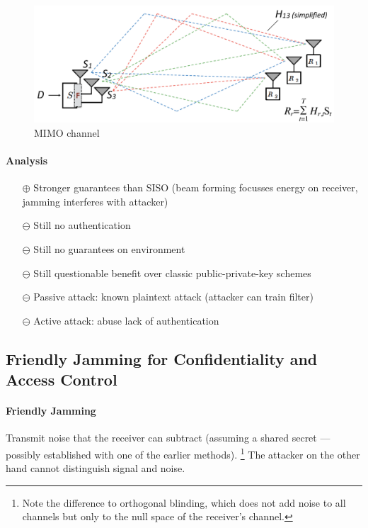\begin{figure}[h]
	\centering
	\includegraphics[scale=0.3]{images/7-mimo.png}
	\caption{MIMO channel}%
	\label{fig:mimo}
\end{figure}

\paragraph{Analysis}
\begin{itemize}
	\item[$\oplus$] Stronger guarantees than SISO (beam forming focusses energy on receiver, jamming interferes with attacker)
	\item[$\ominus$] Still no authentication
	\item[$\ominus$] Still no guarantees on environment
	\item[$\ominus$] Still questionable benefit over classic public-private-key
	 schemes
	\item[$\ominus$] Passive attack: known plaintext attack (attacker can train filter)
	\item[$\ominus$] Active attack: abuse lack of authentication
\end{itemize}


\subsection{Friendly Jamming for Confidentiality and Access Control}

\paragraph{Friendly Jamming}
Transmit noise that the receiver can subtract (assuming a shared secret --- possibly established with one of the earlier methods).%
\footnote{Note the difference to orthogonal blinding, which does not add noise to all channels but only to the null space of the receiver's channel.}
The attacker on the other hand cannot distinguish signal and noise.

